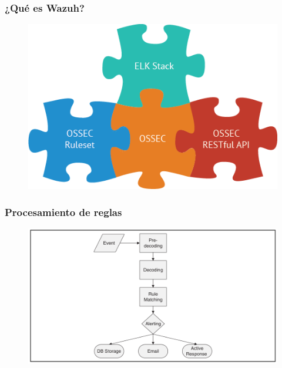 \documentclass[a4paper,10pt]{beamer}
\begin{document}
\begin{frame}[fragile]
	\frametitle{¿Qué es Wazuh?}

	\begin{figure}[H]
		\centering
		\includegraphics[width=.7\textwidth]{../figuras/wazuh_stack.png}
	\end{figure}

\end{frame}

\begin{frame}[fragile]
	\frametitle{Procesamiento de reglas}

	\begin{figure}[H]
		\centering
		\includegraphics[width=\textwidth]{../figuras/Event_Flow.png}
	\end{figure}

\end{frame}
\end{document}
